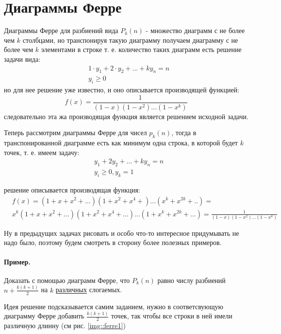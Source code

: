 \section{Диаграммы Ферре}

Диаграммы Ферре для разбиений вида $P_k\left(n\right)$ - множество диаграмм с не более чем $k$ столбцами, но транспонируя такую диаграмму получаем диаграмму с не более чем $k$ элементами в строке т. е. количество таких диаграмм  есть решение задачи вида:
\[
	\begin{split}
		& 1\cdot y_1 + 2\cdot y_2 + ... + k y_n = n \\
		& y_i \ge 0
	\end{split}
\]
но для нее решение уже известно, и оно описывается производящей функцией:
\[
	f\left(x\right) = \frac{1}{\left(1-x\right)\left(1-x^2\right)...\left(1-x^k\right)}
\]
следовательно эта жа производящая функция является решением исходной задачи.

Теперь рассмотрим диаграммы Ферре для чисел $p_k\left(n\right)$, тогда в транспонированной диаграмме есть как минимум одна строка, в которой будет $k$ точек, т. е. имеем задачу:
\[
	\begin{split}
		& y_1 + 2 y_2 + ... +k y_n = n\\
		& y_i \ge 0, y_k = 1
	\end{split}
\]

решение описывается производящая функция:
\[
	\begin{split}
		&f\left(x\right) = \left(1+x+x^2+...\right)\left(1+x^2+x^4+\right)...\left(x^k+x^{2k}+..\right) = \\
		& x^k \left(1+x+x^2+...\right)\left(1+x^2+x^4+...\right)...\left(1+x^k+x^{2k}+...\right) = \frac{1}{\left(1-x\right)\left(1-x^2\right)...\left(1-x^k\right)}
	\end{split}
\]

Ну в предыдущих задачах рисовать и особо что-то интересное придумывать не надо было, поэтому будем смотреть в сторону более полезных примеров.

\paragraph{Пример.} Доказать с помощью диаграмм Ферре, что $P_k\left(n\right)$ равно числу разбиений $n + \frac{k\left(k+1\right)}{2}$ на $k$ \underline{различных} слогаемых.

Идея решение подсказывается самим заданием, нужно в соответсвующую диаграмму Ферре добавить $\frac{k\left(k+1\right)}{2}$ точек, так чтобы все строки в ней имели различную длинну (см рис. \ref{img::ferre1})

